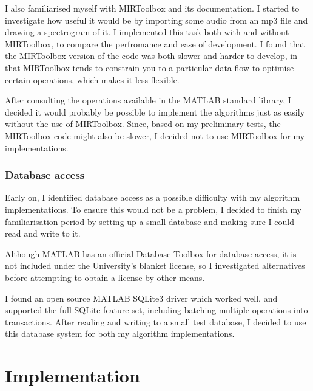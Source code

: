 \documentclass[12pt,a4paper,twoside,openright]{report}
\begin{document}
I also familiarised myself with MIRToolbox and its documentation. I started to investigate how useful it would be by importing some audio from an mp3 file and drawing a spectrogram of it. I implemented this task both with and without MIRToolbox, to compare the perfromance and ease of development. I found that the MIRToolbox version of the code was both slower and harder to develop, in that MIRToolbox tends to constrain you to a particular data flow to optimise certain operations, which makes it less flexible.

After consulting the operations available in the MATLAB standard library, I decided it would probably be possible to implement the algorithms just as easily without the use of MIRToolbox. Since, based on my preliminary tests, the MIRToolbox code might also be slower, I decided not to use MIRToolbox for my implementations.

\subsection{Database access}
\label{section:dbaccess}

Early on, I identified database access as a possible difficulty with my algorithm implementations. To ensure this would not be a problem, I decided to finish my familiarisation period by setting up a small database and making sure I could read and write to it.

Although MATLAB has an official Database Toolbox for database access, it is not included under the University's blanket license, so I investigated alternatives before attempting to obtain a license by other means.

I found an open source MATLAB SQLite3 driver \cite{Yamaguchi14} which worked well, and supported the full SQLite feature set, including batching multiple operations into transactions. After reading and writing to a small test database, I decided to use this database system for both my algorithm implementations.





\chapter{Implementation}
\label{implementation}
\end{document}

